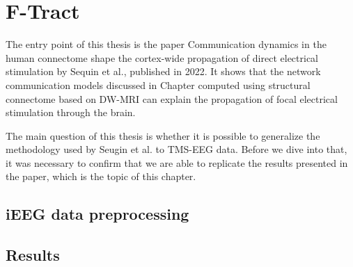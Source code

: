 \chapter{F-Tract}\label{ch:ftract}

The entry point of this thesis is the paper Communication dynamics in the human connectome shape the cortex-wide propagation of direct electrical stimulation by Sequin et al., published in 2022. It shows that the network communication models discussed in Chapter  computed using structural connectome based on DW-MRI can explain the propagation of focal electrical stimulation through the brain. 

The main question of this thesis is whether it is possible to generalize the methodology used by Seugin et al. to TMS-EEG data. Before we dive into that, it was necessary to confirm that we are able to replicate the results presented in the paper, which is the topic of this chapter. 


\section{iEEG data preprocessing}



\section{Results}

